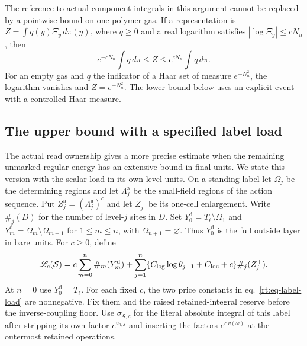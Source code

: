\documentclass[11pt,letterpaper,reqno]{amsart}
\numberwithin{equation}{section}
\renewcommand{\eqref}[1]{\textup{eq.~\ref{#1}}}
\theoremstyle{definition}
\theoremstyle{remark}
\begin{document}
The reference to actual component integrals in this argument
cannot be replaced by a pointwise bound on one polymer gas.
If a representation is \(Z=\int q(y)\Xi_y\,d\pi(y)\), where
\(q\ge0\) and a real logarithm satisfies
\(|\log\Xi_y|\le cN_n\), then
\[
   e^{-cN_n}\int q\,d\pi\le Z\le e^{cN_n}\int q\,d\pi.
\]
For an empty gas and \(q\) the indicator of a Haar set of
measure \(e^{-N_n^2}\), the logarithm vanishes and \(Z=e^{-N_n^2}\).
The lower bound below uses an explicit event with a controlled
Haar measure.

\subsection{The upper bound with a specified label load}

The actual read ownership gives a more precise estimate when the
remaining unmarked regular energy has an extensive bound in final
units. We state this version with the scalar load in its own level
units. On a standing label let \(\Omega_j\) be the determining
regions and let \(\Lambda_j^{\mathrm a}\) be the small-field regions
of the action sequence. Put \(Z_j^{\mathrm a}=(\Lambda_j^{\mathrm a})^c\)
and let \(Z_j^+\) be its one-cell enlargement. Write
\(\#_j(D)\) for the number of level-\(j\) sites in \(D\).
Set \(Y_0^{\mathrm d}=T_\ell\setminus\Omega_1\) and
\(Y_m^{\mathrm d}=\Omega_m\setminus\Omega_{m+1}\) for \(1\le m\le n\),
with \(\Omega_{n+1}=\varnothing\). Thus \(Y_0^{\mathrm d}\) is the
full outside layer in bare units. For \(c\ge0\), define
\begin{equation}\label{rt:eq-label-load}
 \mathscr L_c(\mathcal S)
   =c\sum_{m=0}^{n}\#_m(Y_m^{\mathrm d})
      +\sum_{j=1}^{n}
       \{C_{\log}\log\theta_{j-1}+C_{\rm loc}+c\}\#_j(Z_j^+).
\end{equation}
At \(n=0\) use \(Y_0^{\mathrm d}=T_\ell\). For each fixed $c$, the two price constants in
\eqref{rt:eq-label-load} are nonnegative. Fix them and the raised
retained-integral reserve before the inverse-coupling floor. Use \(\sigma_{\mathcal S,c}\) for the
literal absolute integral of this label after stripping its
own factor \(e^{v_{n,\mathcal S}}\) and inserting the factors
\(e^{c\,v(\omega)}\) at the outermost retained operations.
\end{document}

